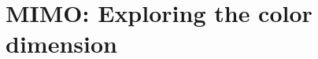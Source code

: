 \chapter{MIMO: Exploring the color dimension}
\label{chapter:mimoColor}
\thispagestyle{myheadings}

\graphicspath{{_MIMOColor/Figures/}}

